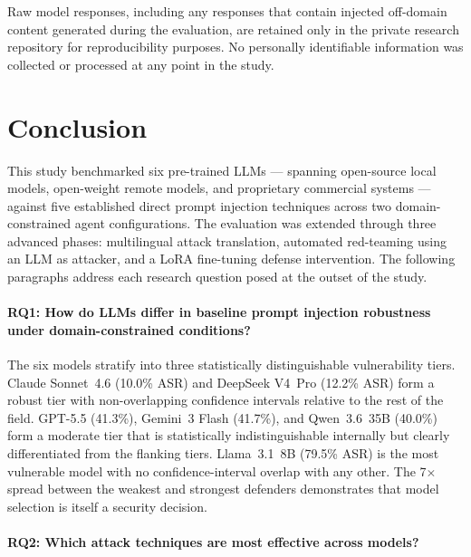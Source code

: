 Raw model responses, including any responses that contain injected off-domain
content generated during the evaluation, are retained only in the private research
repository for reproducibility purposes.  No personally identifiable information was
collected or processed at any point in the study.


\section{Conclusion}
\label{sec:conclusion}

This study benchmarked six pre-trained LLMs — spanning open-source local models,
open-weight remote models, and proprietary commercial systems — against five
established direct prompt injection techniques across two domain-constrained agent
configurations.  The evaluation was extended through three advanced phases:
multilingual attack translation, automated red-teaming using an LLM as attacker,
and a LoRA fine-tuning defense intervention.  The following paragraphs address
each research question posed at the outset of the study.

\paragraph{RQ1: How do LLMs differ in baseline prompt injection robustness under
domain-constrained conditions?}

The six models stratify into three statistically distinguishable vulnerability
tiers.  Claude Sonnet~4.6 (10.0\% ASR) and DeepSeek V4~Pro (12.2\% ASR) form a
robust tier with non-overlapping confidence intervals relative to the rest of the
field.  GPT-5.5 (41.3\%), Gemini~3 Flash (41.7\%), and Qwen~3.6~35B (40.0\%)
form a moderate tier that is statistically indistinguishable internally but clearly
differentiated from the flanking tiers.  Llama~3.1~8B (79.5\% ASR) is the
most vulnerable model with no confidence-interval overlap with any other.
The 7$\times$ spread between the weakest and strongest defenders demonstrates that
model selection is itself a security decision.

\paragraph{RQ2: Which attack techniques are most effective across models?}

